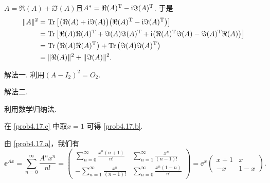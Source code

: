 \begin{solution}
  $A=\Re(A)+\ii\Im(A)$且$A^\ast=\Re(A)^{\mathrm T}-\mathrm i\Im(A)^{\mathrm T}$. 于是
  \begin{align*}
    \|A\|^2 & = \operatorname{Tr}\big[ \big( \Re(A) + \mathrm i\Im(A) \big)\big( \Re(A)^{\mathrm T} - \mathrm i\Im(A)^{\mathrm T} \big) \big] \\
    & = \operatorname{Tr}\big[ \Re(A)\Re(A)^{\mathrm T} + \Im(A)\Im(A)^{\mathrm T} + \mathrm i \big( \Re(A)^{\mathrm T} \Im(A) - \Im(A)^{\mathrm T}\Re(A) \big) \big] \\
    & = \operatorname{Tr}\big( \Re(A)\Re(A)^{\mathrm T} \big) + \operatorname{Tr}\big( \Im(A)\Im(A)^{\mathrm T} \big) \\
    & = \|\Re(A)\|^2 + \|\Im(A)\|^2.
  \end{align*}
\end{solution}

\begin{solution}
  {\kaishu 解法一.} 利用$(A-I_2)^2=O_2$.

  {\kaishu 解法二.} \begin{inparaenum}[(a)]
    \item 利用数学归纳法.

    \item 在 \ref{prob4.17.c} 中取$x=1$ 可得 \ref{prob4.17.b}.

    \item 由 \ref{prob4.17.a}，我们有
    \[
      \ee^{Ax} = \sum_{n=0}^\infty \frac{A^nx^n}{n!} = \begin{pmatrix}
        \sum_{n=0}^\infty \frac{x^n(n+1)}{n!} & \sum_{n=1}^\infty \frac{x^n}{(n-1)!} \\
        -\sum_{n=1}^\infty \frac{x^n}{(n-1)!} & \sum_{n=0}^\infty \frac{x^n(1-n)}{n!}
      \end{pmatrix} = \ee^x \begin{pmatrix}
        x+1 & x \\
        -x & 1-x
      \end{pmatrix}.
    \]
  \end{inparaenum}
\end{solution}

